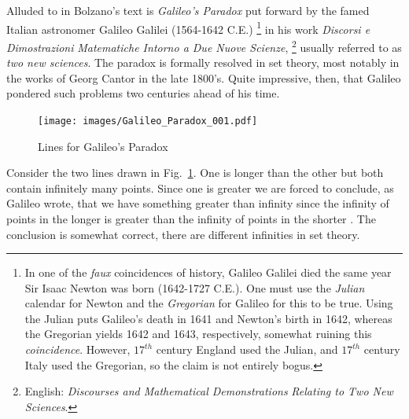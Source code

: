            \par\hfill\par
            Alluded to in Bolzano's text is \textit{Galileo's Paradox}%
             put forward by
            the famed Italian astronomer Galileo Galilei
            (1564-1642 C.E.)%
            \footnote{%
                In one of the \textit{faux} coincidences of history, Galileo
                Galilei died the same year Sir Isaac Newton was born
                (1642-1727 C.E.). One must use the \textit{Julian} calendar for
                Newton and the \textit{Gregorian} for Galileo for this to be
                true. Using the Julian puts Galileo's death in 1641 and Newton's
                birth in 1642, whereas the Gregorian yields 1642 and 1643,
                respectively, somewhat ruining this \textit{coincidence}.
                However, $17^{th}$ century England used the Julian, and
                $17^{th}$ century Italy used the Gregorian, so
                the claim is not entirely bogus.
            }
            in his work \textit{Discorsi e Dimostrazioni}
            \textit{Matematiche Intorno a Due Nuove Scienze},%
            \footnote{%
                English: \textit{Discourses and Mathematical Demonstrations}
                \textit{Relating to Two New Sciences}.
            }
            usually referred to as \textit{two new sciences}. The paradox is
            formally resolved in set theory, most notably in the works of Georg
            Cantor in the late 1800's. Quite impressive, then, that Galileo
            pondered such problems two centuries ahead of his time.
            \begin{figure}
                \centering
                \captionsetup{type=figure}
                \texttt{[image: images/Galileo\_Paradox\_001.pdf]}
                \caption{Lines for Galileo's Paradox}
                \label{fig:Galileo_Paradox_001}
            \end{figure}
            Consider the two lines drawn in Fig.~\ref{fig:Galileo_Paradox_001}.
            One is longer than the other but both contain infinitely many
            points. Since one is greater we are forced to conclude, as Galileo
            wrote, that we have something greater than infinity since the
            infinity of points in the longer is greater than the infinity of
            points in the shorter \cite{GalileoTwoNewSciences}. The conclusion
            is somewhat correct, there are different infinities in set theory.
